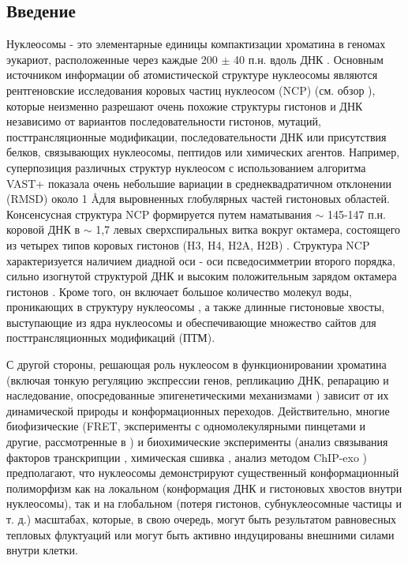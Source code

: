 \subsection{Введение}
    Нуклеосомы - это элементарные единицы компактизации хроматина в геномах эукариот, расположенные через каждые 200 $\pm$ 40 п.н. вдоль ДНК \cite{mcghee_nucleosome_1980}. Основным источником информации об атомистической структуре нуклеосомы являются рентгеновские исследования коровых частиц нуклеосом (NCP) (см. обзор \cite{dechassa_nucleosomes_2011}), которые неизменно разрешают очень похожие структуры гистонов и ДНК независимо от вариантов последовательности гистонов, мутаций, посттрансляционные модификации, последовательности ДНК или присутствия белков, связывающих нуклеосомы, пептидов или химических агентов. Например, суперпозиция различных структур нуклеосом с использованием алгоритма VAST+ \cite{madej_mmdb_2014} показала очень небольшие вариации в среднеквадратичном отклонении (RMSD) около 1 \AA для выровненных глобулярных частей гистоновых областей. Консенсусная структура NCP формируется путем наматывания $\sim$ 145-147 п.н. коровой ДНК в $\sim$ 1,7 левых сверхспиральных витка вокруг октамера, состоящего из четырех типов коровых гистонов (H3, H4, H2A, H2B) \cite{marino-ramirez_histone_2011}. Структура NCP характеризуется наличием диадной оси - оси псведосимметрии второго порядка, сильно изогнутой структурой ДНК \cite{tolstorukov_novel_2007} и высоким положительным зарядом октамера гистонов \cite{fenley_charge_2010}. Кроме того, он включает большое количество молекул воды, проникающих в структуру нуклеосомы \cite{davey_solvent_2002}, а также длинные гистоновые хвосты, выступающие из ядра нуклеосомы и обеспечивающие множество сайтов для посттрансляционных модификаций (ПТМ).

    С другой стороны, решающая роль нуклеосом в функционировании хроматина (включая тонкую регуляцию экспрессии генов, репликацию ДНК, репарацию и наследование, опосредованные эпигенетическими механизмами \cite{henikoff_nucleosome_2008,petty_balancing_2013}) зависит от их динамической природы и конформационных переходов. Действительно, многие биофизические (FRET, эксперименты с одномолекулярными пинцетами и другие, рассмотренные в \cite{choy_structural_2012}) и биохимические эксперименты (анализ связывания факторов транскрипции \cite{li_rapid_2005}, химическая сшивка \cite{lee_n-terminal_1997}, анализ методом ChIP-exo  \cite{rhee_subnucleosomal_2014}) предполагают, что нуклеосомы демонстрируют существенный конформационный полиморфизм как на локальном (конформация ДНК и гистоновых хвостов внутри нуклеосомы), так и на глобальном (потеря гистонов, субнуклеосомные частицы и т. д.) масштабах, которые, в свою очередь, могут быть результатом равновесных тепловых флуктуаций или могут быть активно индуцированы внешними силами внутри клетки.
    
